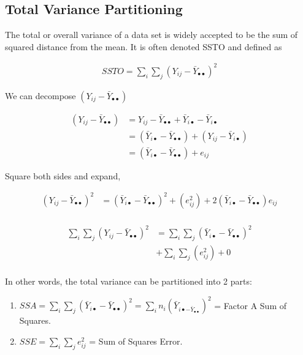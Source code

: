 \documentclass[10pt]{article}
\newcommand{\define}[1]{\colorbox{Thistle2}{#1}}
\begin{document}
\begin{multicols}{3}
    \subsection{Total Variance Partitioning}

    The total or overall variance of a data set is widely accepted to be the sum of squared distance from the mean. It is often denoted SSTO and defined as 

    \begin{align*}
        SSTO = \sum_i \sum_j (Y_{ij} - \bar Y_{\bullet\bullet})^2
    \end{align*}

    We can decompose $(Y_{ij} - \bar Y_{\bullet\bullet})$

    \begin{align*}
        (Y_{ij} - \bar Y_{\bullet\bullet}) & = Y_{ij} - \bar Y_{\bullet\bullet} + \bar Y_{i\bullet} - \bar Y_{i\bullet} \\
            & = (\bar Y_{i\bullet} - \bar Y_{\bullet\bullet}) + (Y_{ij} - \bar Y_{i\bullet}) \\
            & = (\bar Y_{i\bullet} - \bar Y_{\bullet\bullet}) + e_{ij}
    \end{align*}

    \newcommand{\bul}{\bullet}

    Square both sides and expand,

    \begin{align*}
        (Y_{ij} - \bar Y_{\bul\bul})^2 & = (\bar Y_{i\bul} - \bar Y_{\bul\bul})^2 + (e_{ij}^2) + 2(\bar Y_{i\bul} - \bar Y_{\bul\bul}) e_{ij} \\
    \end{align*}

    \begin{align*}
        \sum_i \sum_j (Y_{ij} - \bar Y_{\bul\bul})^2 & = \sum_i \sum_j (\bar Y_{i\bul} - \bar Y_{\bul\bul})^2  \\
        & + \sum_i \sum_j(e_{ij}^2) + 0 \\
    \end{align*}

    In other words, the total variance can be partitioned into 2 parts:

    \begin{enumerate}
        \item $SSA = \sum_i \sum_j (\bar Y_{i\bul} - \bar Y_{\bul\bul})^2 = \sum_i n_i (\bar Y_{i\bul - \bar Y_{\bul\bul}})^2$ = \define{Factor A Sum of Squares}.
        \item $SSE = \sum_i \sum_j e_{ij}^2$ = \define{Sum of Squares Error}.
    \end{enumerate}


\end{multicols}
\end{document}
